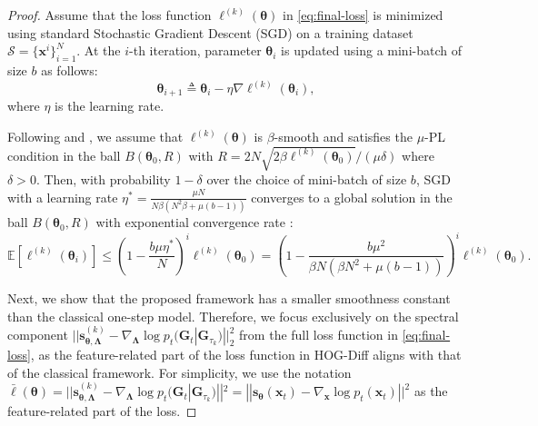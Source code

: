 \begin{proof}
Assume that the loss function $\ell^{(k)}(\bm{\theta})$ in \cref{eq:final-loss} is minimized using standard Stochastic Gradient Descent (SGD) on a training dataset $\mathcal{S}=\{\mathbf{x}^i\}_{i=1}^N$. At the $i$-th iteration, parameter $\bm{\theta}_i$ is updated using a mini-batch of size $b$ as follows:
\begin{equation}
    \bm{\theta}_{i+1} \triangleq \bm{\theta}_i - \eta \nabla \ell^{(k)}(\bm{\theta}_i),
\end{equation}
where $\eta$ is the learning rate.


Following \citet{liu2020toward} and \citet{GSDM+TPAMI2023}, we assume that $\ell^{(k)}(\bm{\theta})$ is $\beta$-smooth and satisfies the $\mu$-PL condition in the ball $B(\bm{\theta}_0, R)$ with $R=2N\sqrt{2\beta \ell^{(k)}(\bm{\theta}_0)}/(\mu\delta)$ where $\delta>0$. 
%
Then, with probability $1-\delta$ over the choice of mini-batch of size $b$, SGD with a learning  rate $\eta^* =\frac{\mu N}{N\beta (N^2\beta +\mu(b-1))}$ converges to a global solution in the ball $B(\bm{\theta}_0, R)$ with exponential convergence rate \cite{liu2020toward}:
\begin{equation}
\mathbb{E}[\ell^{(k)}(\bm{\theta}_i)] 
\leq \left(1-\frac{b\mu\eta^*}{N}\right)^i \ell^{(k)}(\bm{\theta}_0)
= \left(1-\frac{b\mu^2}{\beta N(\beta N^2+\mu(b-1))}\right)^i \ell^{(k)}(\bm{\theta}_0).
\end{equation}

Next, we show that the proposed framework has a smaller smoothness constant than the classical one-step model. 
Therefore, we focus exclusively on the spectral component $||\bm{s}^{(k)}_{\bm{\theta},\bm{\Lambda}} - \nabla_{\bm{\Lambda}} \log p_t(\bm{G}_t | \bm{G}_{\tau_k})||_2^2$ from the full loss function in \cref{eq:final-loss}, as the feature-related part of the loss function in HOG-Diff aligns with that of the classical framework.  
For simplicity, we use the notation $\bar{\ell}(\bm{\theta})=||\bm{s}^{(k)}_{\bm{\theta},\bm{\Lambda}} - \nabla_{\bm{\Lambda}} \log p_t(\bm{G}_t | \bm{G}_{\tau_k})||^2 = ||\bm{s}_{\bm{\theta}}(\mathbf{x}_t) - \nabla_{\mathbf{x}} \log p_t(\mathbf{x}_t)||^2$ as the feature-related part of the loss.%



\end{proof}
